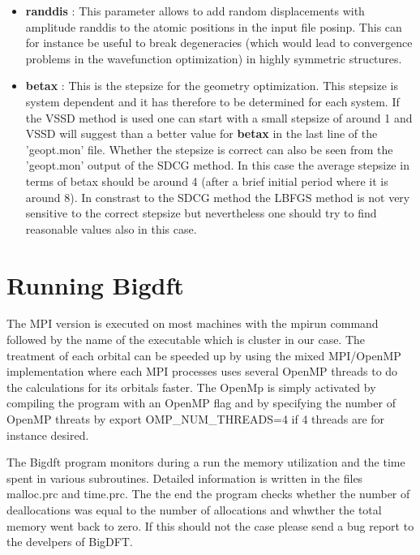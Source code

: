 \documentclass[a4paper,11pt]{report}
\begin{document}
\begin{itemize}
\item  {\bf randdis } : This parameter allows to add random displacements with amplitude randdis to the atomic positions in the 
                        input file posinp. This can for instance be useful to break degeneracies (which would lead to 
                        convergence problems in the wavefunction optimization) in highly symmetric structures.
\item  {\bf betax } : This is the stepsize for the geometry optimization. This stepsize is system dependent and it has therefore to be 
                      determined for each system. If the VSSD method is used one can start with a small stepsize of around 1 and 
                      VSSD will suggest than a better value for {\bf betax } in the last line of the 'geopt.mon' file. 
                      Whether the stepsize is correct can also be seen from the 'geopt.mon' output of the SDCG method. In this 
                      case the average stepsize in terms of betax should be around 4 (after a brief initial period where it is around 8).
                      In constrast to the SDCG method the LBFGS method is not very sensitive to the correct stepsize but nevertheless 
                      one should try to find reasonable values also in this case.
\end{itemize}


\chapter{ \bf Running Bigdft}
The MPI version is executed on most machines with the mpirun command followed by the name of the executable which is 
cluster in our case.
The treatment of each orbital can be speeded up by using the mixed MPI/OpenMP implementation 
where each MPI processes uses several OpenMP threads to do the calculations for its orbitals faster. 
The OpenMp is simply activated by compiling the program with an OpenMP flag and by specifying the number of OpenMP threats by
export OMP_NUM_THREADS=4 if 4 threads are for instance desired.

\noindent
The Bigdft program monitors during a run the memory utilization and the time spent in various subroutines. Detailed information 
is written in the files malloc.prc and time.prc. The the end the program checks whether the number of deallocations was equal 
to the number of allocations and whwther the total memory went back to zero. If this should not the case please send a bug report 
to the develpers of BigDFT. 
\end{document}
